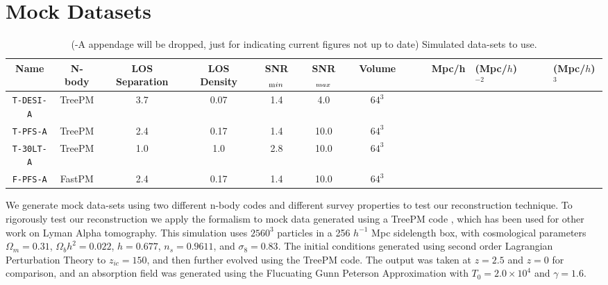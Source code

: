 \documentclass[times]{aastex62}
\begin{document}
\section{Mock Datasets}
\label{sec:mocks}
\begin{table}
  \begin{center}
    \label{tab:table1}
    \begin{tabular}{c|c|c|c|c|c|c} %
      \textbf{Name} & \textbf{N-body} & \textbf{LOS Separation} &\textbf{LOS Density} & \textbf{SNR$_{\textrm min}$} &\textbf{SNR$_{\textrm max}$} & \textbf{Volume} \ \
      &  & & Mpc/h &  (Mpc/$h$)$^{-2}$ & & & (Mpc/$h$)$^3$ \\
      \hline
    \hline
        \texttt{T-DESI-A} & TreePM & 3.7 & 0.07 & 1.4 & 4.0 & $64^3$\\
        \texttt{T-PFS-A} & TreePM & 2.4 & 0.17 & 1.4 & 10.0 & $64^3$ \\
        \texttt{T-30LT-A} & TreePM & 1.0 & 1.0 & 2.8 & 10.0 & $64^3$ \\
        \texttt{F-PFS-A} & FastPM & 2.4 & 0.17 & 1.4 & 10.0 & $64^3$\\
    \end{tabular}
        \caption{ (-A appendage will be dropped, just for indicating current figures not up to date) Simulated data-sets to use.}

  \end{center}
\end{table}

We generate mock data-sets using two different n-body codes and different survey properties to test our reconstruction technique. 
To rigorously test our reconstruction we apply the formalism to mock data generated using a TreePM code \cite{2002White,2010White}, which has been used for other work on Lyman Alpha tomography. \cite{2018Krolewski,2015StarkProtocluster,Stark2015,2015StarkProtocluster} This simulation uses $2560^3$ particles in a 256 $h^{-1}$ Mpc sidelength box, with cosmological parameters $\Omega_m = 0.31$, $\Omega_b h^2 = 0.022$, $h = 0.677$, $n_s = 0.9611$, and $\sigma_8=0.83$. The initial conditions generated using second order Lagrangian Perturbation Theory to $z_{ic}=150$, and then further evolved using the TreePM code. The output was taken at $z=2.5$ and $z=0$ for comparison, and an absorption field was generated using the Flucuating Gunn Peterson Approximation with $T_0 = 2.0 \times 10^4$ and $\gamma=1.6$.
\end{document}
